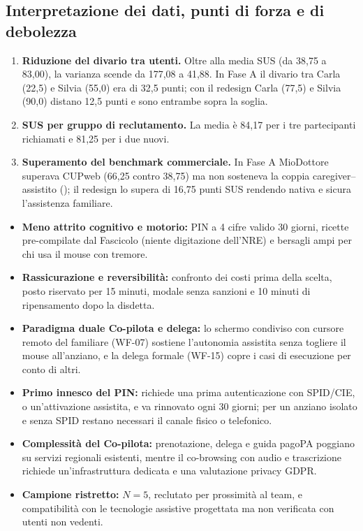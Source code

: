 \subsection{Interpretazione dei dati, punti di forza e di debolezza}


\begin{enumerate}
\item \textbf{Riduzione del divario tra utenti.} Oltre alla media SUS (da 38,75 a 83,00), la varianza scende da 177,08 a 41,88. In Fase A il divario tra Carla (22,5) e Silvia (55,0) era di 32,5 punti; con il redesign Carla (77,5) e Silvia (90,0) distano 12,5 punti e sono entrambe sopra la soglia.
\item \textbf{SUS per gruppo di reclutamento.} La media è 84,17 per i tre partecipanti richiamati e 81,25 per i due nuovi.
\item \textbf{Superamento del benchmark commerciale.} In Fase A MioDottore superava CUPweb (66,25 contro 38,75) ma non sosteneva la coppia caregiver--assistito (); il redesign lo supera di 16,75 punti SUS rendendo nativa e sicura l'assistenza familiare.
\end{enumerate}


\begin{itemize}
\item \textbf{Meno attrito cognitivo e motorio:} PIN a 4 cifre valido 30 giorni, ricette pre-compilate dal Fascicolo (niente digitazione dell'NRE) e bersagli ampi per chi usa il mouse con tremore.
\item \textbf{Rassicurazione e reversibilità:} confronto dei costi prima della scelta, posto riservato per 15 minuti, modale senza sanzioni e 10 minuti di ripensamento dopo la disdetta.
\item \textbf{Paradigma duale Co-pilota e delega:} lo schermo condiviso con cursore remoto del familiare (WF-07) sostiene l'autonomia assistita senza togliere il mouse all'anziano, e la delega formale (WF-15) copre i casi di esecuzione per conto di altri.
\end{itemize}


\begin{itemize}
\item \textbf{Primo innesco del PIN:} richiede una prima autenticazione con SPID/CIE, o un'attivazione assistita, e va rinnovato ogni 30 giorni; per un anziano isolato e senza SPID restano necessari il canale fisico o telefonico.
\item \textbf{Complessità del Co-pilota:} prenotazione, delega e guida pagoPA poggiano su servizi regionali esistenti, mentre il co-browsing con audio e trascrizione richiede un'infrastruttura dedicata e una valutazione privacy GDPR.
\item \textbf{Campione ristretto:} $N=5$, reclutato per prossimità al team, e compatibilità con le tecnologie assistive progettata ma non verificata con utenti non vedenti.
\end{itemize}

